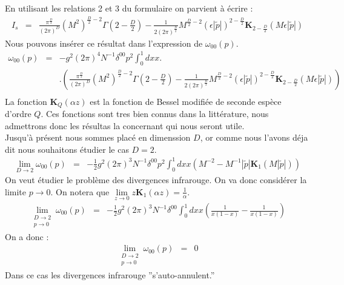 \documentclass[a4paper,11pt]{article} %
\theoremstyle{plain}
\theoremstyle{definition}
\theoremstyle{remark}
\numberwithin{equation}{section}
\numberwithin{equation}{subsection}
\numberwithin{figure}{section}
\begin{document}
En utilisant les relations 2 et 3 du formulaire on parvient à écrire :
\begin{eqnarray*}
 I_{s}  &=&  \frac{ \pi^{\frac{D}{2}} }{ (2 \pi)^{D}  }  (M^2)^{\frac{D}{2}-2} \Gamma(2-\frac{D}{2})
-  \frac{1}{2 (2 \pi )^{\frac{D}{2}}}  M^{\frac{D}{2} - 2}  \left( \epsilon \left| \tilde{p}  \right|  \right)^{ 2-\frac{D}{2} }   
\textbf{K}_{2- \frac{D}{2}  } ( M \epsilon  \left| \tilde{p}  \right|  )
\end{eqnarray*}
Nous pouvons insérer ce résultat dans l'expression de $ \omega_{00}(p)$. 
\begin{eqnarray*}
 \omega_{00}(p) &=&  - g^2  (2 \pi)^4  N^{-1}   \delta^{00}   p^2
\int_{0}^{1}  dx  x  . \nonumber \\
&&  .\left(
\frac{ \pi^{\frac{D}{2}} }{ (2 \pi)^{D}  }  (M^2)^{\frac{D}{2}-2} \Gamma(2-\frac{D}{2})
-  \frac{1}{2 (2 \pi )^{\frac{D}{2}}}  M^{\frac{D}{2} - 2}  \left( \epsilon \left| \tilde{p}  \right|  \right)^{ 2-\frac{D}{2} }   
\textbf{K}_{2- \frac{D}{2}  } ( M \epsilon  \left| \tilde{p}  \right|  )
\right)    \nonumber  \\
\end{eqnarray*}
La fonction $\textbf{K}_{Q } (\alpha z)$ est la fonction de Bessel modifiée de seconde espèce d'ordre $Q$. Ces fonctions sont tres bien 
connus dans la littérature, nous admettrons donc les résultas la concernant qui nous seront utile. \\
Jusqu'à présent nous sommes placé en dimenssion $D$, or comme nous l'avons déja dit nous souhaitons étudier le cas $D=2$.
\begin{eqnarray*}
 \lim\limits_{D \to 2}   \omega_{00}(p)  &=&   - \frac{1}{2}  g^2  (2 \pi)^3  N^{-1} \delta^{00} p^2
\int_{0}^{1}  dx  x
\left(
M^{-2} 
-   M^{-1}  \left| \tilde{p}  \right|  \textbf{K}_{ 1 } ( M  \left| \tilde{p}  \right|  )
\right)
\end{eqnarray*}
On veut étudier le problème des divergences infrarouge. On va donc considérer la limite $p \to 0$. On notera que
$ \lim\limits_{z \to 0} z \textbf{K}_{1 } (\alpha z) = \frac{1}{\alpha}$.
\begin{eqnarray*}
 \lim\limits_{
\begin{array}{l}
D \to 2\\
p \to 0
\end{array}}   \omega_{00}(p)  &=&   - \frac{1}{2}  g^2  (2 \pi)^3  N^{-1} \delta^{00}
\int_{0}^{1}  dx  x
\left(
 \frac{1}{x(1-x)} 
-  \frac{1}{x(1-x)} 
\right)      
\end{eqnarray*}
On a donc :
\begin{eqnarray*}
 \lim\limits_{
\begin{array}{l}
D \to 2\\
p \to 0
\end{array}}   \omega_{00}(p)  &=&  0
\end{eqnarray*}
Dans ce cas les divergences infrarouge ''s'auto-annulent.''
\end{document}
